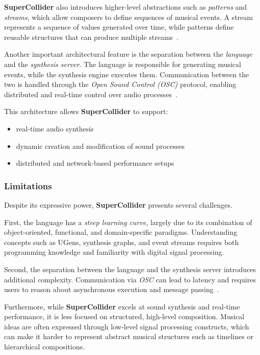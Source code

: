\textbf{SuperCollider} also introduces higher-level abstractions such as \textit{patterns} and \textit{streams}, which
allow composers to define sequences of musical events.
A stream represents a sequence of values generated over time, while patterns define reusable structures that can produce
multiple streams~\cite{McCartney_2002}.

Another important architectural feature is the separation between the \textit{language} and the
\textit{synthesis server}.
The language is responsible for generating musical events, while the synthesis engine executes them.
Communication between the two is handled through the \textit{Open Sound Control (OSC)} protocol, enabling distributed
and real-time control over audio processes~\cite{McCartney_2002}.

This architecture allows \textbf{SuperCollider} to support:

\begin{itemize}
  \item real-time audio synthesis
  \item dynamic creation and modification of sound processes
  \item distributed and network-based performance setups
\end{itemize}


\subsubsection{Limitations}

Despite its expressive power, \textbf{SuperCollider} presents several challenges.

First, the language has a \textit{steep learning curve}, largely due to its combination of object-oriented, functional,
and domain-specific paradigms.
Understanding concepts such as UGens, synthesis graphs, and event streams requires both programming knowledge and
familiarity with digital signal processing.

Second, the separation between the language and the synthesis server introduces additional complexity.
Communication via \textit{OSC} can lead to latency and requires users to reason about asynchronous execution
and message passing~\cite{McCartney_2002}.

Furthermore, while \textbf{SuperCollider} excels at sound synthesis and real-time performance, it is less focused on
structured, high-level composition.
Musical ideas are often expressed through low-level signal processing constructs, which can make it harder to represent
abstract musical structures such as timelines or hierarchical compositions.

